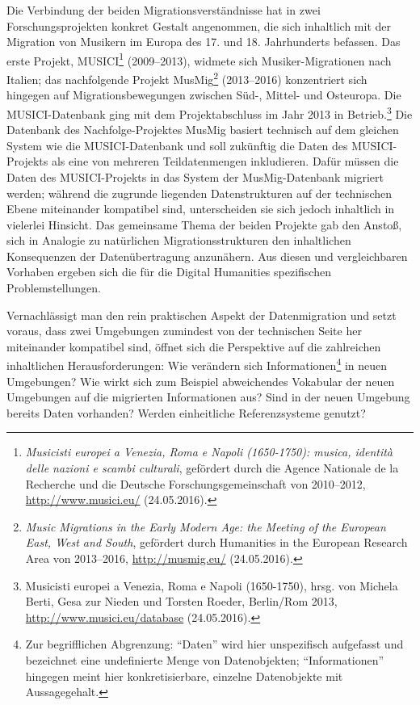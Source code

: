 \documentclass[a4paper,
fontsize=11pt,
oneside,
numbers=noperiodatend,
parskip=half-,
bibliography=totoc,
final
]{scrartcl}
\begin{document}
Die Verbindung der beiden Migrationsverständnisse hat in zwei
Forschungsprojekten konkret Gestalt angenommen, die sich inhaltlich mit
der Migration von Musikern im Europa des 17. und 18. Jahrhunderts
befassen. Das erste Projekt, MUSICI\footnote{\emph{Musicisti europei a
  Venezia, Roma e Napoli (1650-1750): musica, identità delle nazioni e
  scambi culturali}, gefördert durch die Agence Nationale de la
  Recherche und die Deutsche Forschungsgemeinschaft von 2010--2012,
  \url{http://www.musici.eu/} (24.05.2016).} (2009--2013), widmete sich
Musiker-Migrationen nach Italien; das nachfolgende Projekt
MusMig\footnote{\emph{Music Migrations in the Early Modern Age: the
  Meeting of the European East, West and South}, gefördert durch
  Humanities in the European Research Area von 2013--2016,
  \url{http://musmig.eu/} (24.05.2016).} (2013--2016) konzentriert sich
hingegen auf Migrationsbewegungen zwischen Süd-, Mittel- und Osteuropa.
Die MUSICI-Datenbank ging mit dem Projektabschluss im Jahr 2013 in
Betrieb.\footnote{Musicisti europei a Venezia, Roma e Napoli
  (1650-1750), hrsg. von Michela Berti, Gesa zur Nieden und Torsten
  Roeder, Berlin/Rom 2013, \url{http://www.musici.eu/database}
  (24.05.2016).} Die Datenbank des Nachfolge-Projektes MusMig basiert
technisch auf dem gleichen System wie die MUSICI-Datenbank und soll
zukünftig die Daten des MUSICI-Projekts als eine von mehreren
Teildatenmengen inkludieren. Dafür müssen die Daten des MUSICI-Projekts
in das System der MusMig-Datenbank migriert werden; während die zugrunde
liegenden Datenstrukturen auf der technischen Ebene miteinander
kompatibel sind, unterscheiden sie sich jedoch inhaltlich in vielerlei
Hinsicht. Das gemeinsame Thema der beiden Projekte gab den Anstoß, sich
in Analogie zu natürlichen Migrationsstrukturen den inhaltlichen
Konsequenzen der Datenübertragung anzunähern. Aus diesen und
vergleichbaren Vorhaben ergeben sich die für die Digital Humanities
spezifischen Problemstellungen.

Vernachlässigt man den rein praktischen Aspekt der Datenmigration und
setzt voraus, dass zwei Umgebungen zumindest von der technischen Seite
her miteinander kompatibel sind, öffnet sich die Perspektive auf die
zahlreichen inhaltlichen Herausforderungen: Wie verändern sich
Informationen\footnote{Zur begrifflichen Abgrenzung: \enquote{Daten}
  wird hier unspezifisch aufgefasst und bezeichnet eine undefinierte
  Menge von Datenobjekten; \enquote{Informationen} hingegen meint hier
  konkretisierbare, einzelne Datenobjekte mit Aussagegehalt.} in neuen
Umgebungen? Wie wirkt sich zum Beispiel abweichendes Vokabular der neuen
Umgebungen auf die migrierten Informationen aus? Sind in der neuen
Umgebung bereits Daten vorhanden? Werden einheitliche Referenzsysteme
genutzt?
\end{document}

